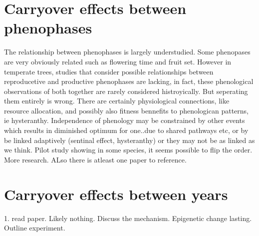 \documentclass{article}\usepackage[]{graphicx}\usepackage[]{color}
\begin{document}
\section{Carryover effects between phenophases}
The relationship between phenophases is largely understudied. Some phenopases are very obviously related such as flowering time and fruit set. However in temperate trees, studies that consider possible relationships between reproducetive and productive phenophases are lacking, in fact, these phenological observations of both together are rarely considered histroyically. But seperating them entirely is wrong. There are certainly physiological connections, like resource allocation, and possibly also fitness bennefits to phenologican patterns, ie hysteranthy. Independence of phenology may be constrained by other events which results in diminished optimum for one..due to shared pathways etc, or by be linked adaptively (sentinal effect, hysteranthy) or they may not be as linked as we think. Pilot study showing in some species, it seems possible to flip the order. More research. ALso there is atleast one paper to reference.
\section{Carryover effects between years}
1. read paper. Likely nothing. Discuss the mechanism. Epigenetic change lasting. Outline experiment.






\end{document}
